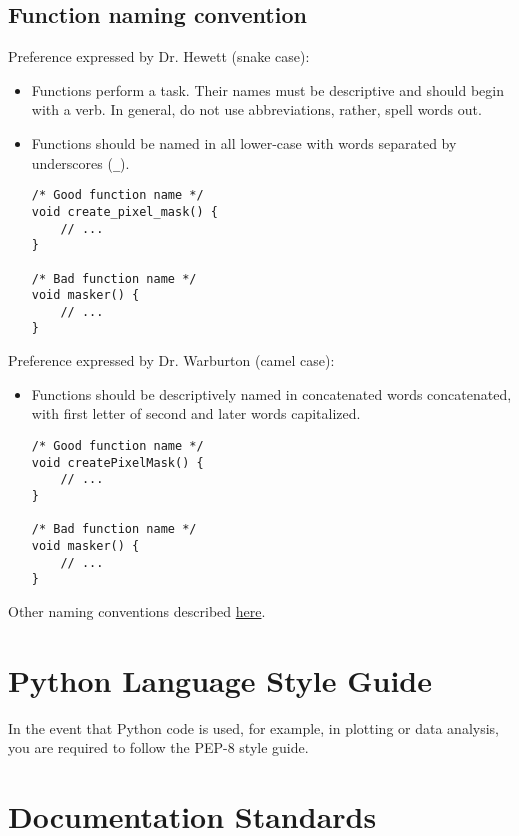 \subsection{Function naming convention}

Preference expressed by Dr. Hewett (snake case):
\begin{itemize}
    \item Functions perform a task.  Their names must be descriptive and should begin with a verb.  In general, do not use abbreviations, rather, spell words out.
    \item Functions should be named in all lower-case with words separated by underscores (\texttt{\_}).
        \begin{verbatim}
/* Good function name */
void create_pixel_mask() {
    // ...
}

/* Bad function name */
void masker() {
    // ...
}
        \end{verbatim}
\end{itemize}

Preference expressed by Dr. Warburton (camel case):

\begin{itemize}
    \item Functions should be descriptively named in concatenated words concatenated, with first letter of second and later words capitalized.
        \begin{verbatim}
/* Good function name */
void createPixelMask() {
    // ...
}

/* Bad function name */
void masker() {
    // ...
}
        \end{verbatim}
\end{itemize}

Other naming conventions described \href{https://medium.com/better-programming/string-case-styles-camel-pascal-snake-and-kebab-case-981407998841}{here}.

\section{Python Language Style Guide}

In the event that Python code is used, for example, in plotting or data analysis, you are required to follow the PEP-8 style guide\cite{vanRossumWarsawEtAl2013}.


\section{Documentation Standards}

